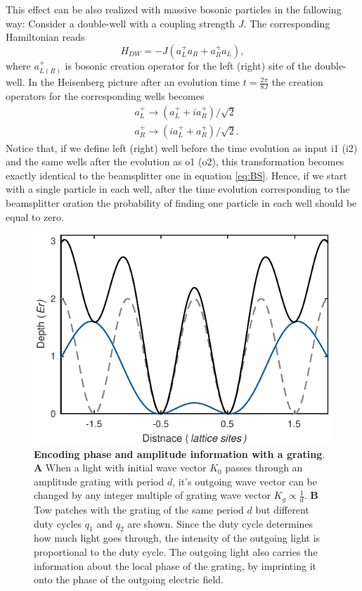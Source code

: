 This effect can be also realized with massive bosonic particles in the fallowing way: Consider a double-well with a coupling strength $J$. The corresponding Hamiltonian reads 
\begin{equation}
H_{DW} = -J(a^+_L a_R + a^+_R a_L),
\end{equation}
where $a^+_{L(R)}$ is bosonic creation operator for the left (right) site of the double-well. In the Heisenberg picture after an evolution time $t= \frac{2 \pi}{8J}$ the creation operators for the corresponding wells becomes
\begin{equation}
\begin{aligned}
& a_{L}^+ \rightarrow (a_{L}^+ +ia_{R}^+ )/\sqrt{2} \\
& a_{R}^+ \rightarrow (ia_{L}^+ +a_{R}^+ )/\sqrt{2}.
\end{aligned}
\end{equation}
Notice that, if we define left (right) well before the time evolution as input i1 (i2) and the same wells after the evolution as o1 (o2), this transformation becomes exactly identical to the beamsplitter one in equation \ref{eq:BS}. Hence, if we start with a single particle in each well, after the time evolution corresponding to the beamsplitter oration the probability of finding one particle in each well should be equal to zero. 

\begin{figure}[t]
	\centering
	\includegraphics[scale=1]{figures/CBH_DW.pdf}
	\caption{{\bf Encoding phase and amplitude information with a grating}. {\bf A} When a light with initial wave vector $K_0$ passes through an amplitude grating with period $d$, it's outgoing wave vector can be changed by any integer multiple of grating wave vector $K_g\propto \frac{1}{d}$. {\bf B} Tow patches with the grating of the same period $d$ but different duty cycles $q_1$ and $q_2$ are shown. Since the duty cycle determines how much light goes through, the intensity of the outgoing light is proportional to the duty cycle. The outgoing light also carries the information about the local phase of the grating, by imprinting it onto the phase of the outgoing electric field.}
	\label{fig:CBH_DW}
\end{figure}

